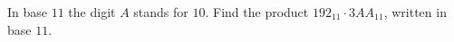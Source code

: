 In base $11$ the digit $A$ stands for $10$. Find the product $192_{11}\cdot3AA_{11}$, written in base $11$.
